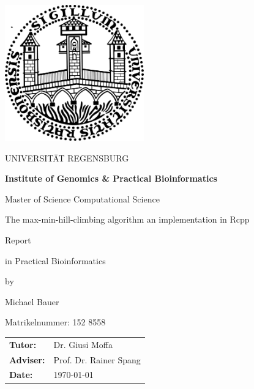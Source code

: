  


\usepackage{geometry}
\geometry{tmargin=2cm,bmargin=3cm,lmargin=2cm,rmargin=2cm}

\usepackage{tikz}
\usetikzlibrary{arrows}



\pagestyle{empty}


\clearscrheadings\clearscrplain

\begin{center}
\includegraphics[width=6cm]{img/uniR.png}

\begin{huge}
UNIVERSITÄT REGENSBURG
\vspace{10mm}
\end{huge}

{\Large \textbf{Institute of Genomics \& Practical Bioinformatics}}
\vspace{0mm}

{\Large Master of Science Computational Science}

\vspace{10mm}
\begin{huge}
The max-min-hill-climbing algorithm an implementation in Rcpp
\end{huge}

\vspace{10mm}

\begin{Large}
Report
\end{Large}

\begin{large}
in Practical Bioinformatics
\end{large}

\vspace{5mm}
\begin{small}
by
\end{small}

\begin{large}
Michael Bauer
\end{large}

\begin{small}
Matrikelnummer: 152 8558
\end{small}

\vspace{1cm}
\begin{tabular}{ll}
{\bf Tutor:} &Dr. Giusi Moffa\\
{\bf Adviser:} &Prof. Dr. Rainer Spang\\
{\bf Date:} &\today\\
\end{tabular}

\end{center}
\clearpage

